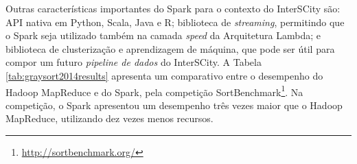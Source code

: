 \begin{table}[!htbp]
    \centering
    \caption[Resultados da Sort Benchmark 2014, categoria GraySort]{Resultados da Sort Benchmark 2014, categoria GraySort. Fonte: Databricks, 2014\footnotemark.}
    \label{tab:graysort2014results}
\end{table}

Outras características importantes do Spark para o contexto do
InterSCity são: API nativa em Python, Scala, Java e R; biblioteca de
\textit{streaming}, permitindo que o Spark seja utilizado também na camada
\textit{speed} da Arquitetura Lambda; e biblioteca de clusterização e
aprendizagem de máquina, que pode ser útil para compor um futuro \textit{pipeline
de dados} do InterSCity. A Tabela \ref{tab:graysort2014results} apresenta
um comparativo entre o desempenho do Hadoop MapReduce e do Spark, pela
competição SortBenchmark\footnote{\url{http://sortbenchmark.org/}}. Na
competição, o Spark apresentou um desempenho três vezes maior que o Hadoop
MapReduce, utilizando dez vezes menos recursos.

